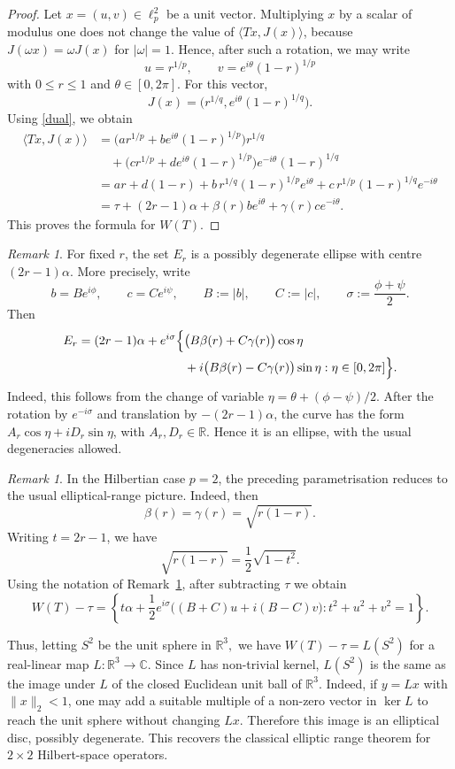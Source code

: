 \documentclass[11pt]{amsart}
\numberwithin{equation}{section}
\theoremstyle{definition}
\theoremstyle{remark}
\newtheorem{remark}[theorem]{Remark}
\newcommand{\R}{\mathbb{R}}
\newcommand{\ip}[2]{\langle #1,#2\rangle}
\begin{document}
\begin{proof}
Let $x=(u,v)\in\ell_p^2$ be a unit vector. Multiplying $x$ by a scalar of modulus one does not change the value of
$\ip{Tx}{J(x)}$, because $J(\omega x)=\omega J(x)$ for $|\omega|=1$. Hence, after such a rotation, we may write
\[
u=r^{1/p},\qquad v=e^{i\theta}(1-r)^{1/p}
\]
with $0\le r\le1$ and $\theta\in [0,2\pi].$ For this vector,
\[
J(x)=\bigl(r^{1/q},e^{i\theta}(1-r)^{1/q}\bigr).
\]
Using \eqref{dual}, 
we obtain
\begin{align*}
\ip{Tx}{J(x)}
&=\bigl(ar^{1/p}+be^{i\theta}(1-r)^{1/p}\bigr)r^{1/q}  \\
&\quad+\bigl(cr^{1/p}+de^{i\theta}(1-r)^{1/p}\bigr)e^{-i\theta}(1-r)^{1/q} \\
&=ar+d(1-r)+b\,r^{1/q}(1-r)^{1/p}e^{i\theta}
   +c\,r^{1/p}(1-r)^{1/q}e^{-i\theta} \\
&=\tau+(2r-1)\alpha+\beta(r)be^{i\theta}+
   \gamma(r)ce^{-i\theta}.
\end{align*}
This proves the formula for $W(T)$.
\end{proof}

\begin{remark}\label{rem:lp2-ellipses}
For fixed $r$, the set $E_r$ is a possibly degenerate ellipse with centre
$(2r-1)\alpha$. More precisely, write
\[
b=Be^{i\phi},\qquad c=Ce^{i\psi},\qquad
B:=|b|,
\qquad C:=|c|,
\qquad \sigma:=\frac{\phi+\psi}{2}.
\]
Then
\[
\begin{aligned}
E_r=(2r-1)\alpha+e^{i\sigma}
\Bigl\{&\bigl(B\beta(r)+C\gamma(r)\bigr)\cos\eta\\
&+i\bigl(B\beta(r)-C\gamma(r)\bigr)\sin\eta:
\eta\in [0,2\pi]
\Bigr\}.
\end{aligned}
\]
Indeed, this follows from the change of variable
$\eta=\theta+(\phi-\psi)/2$. After the rotation by $e^{-i\sigma}$ and
translation by $-(2r-1)\alpha$, the curve has the form
$A_r\cos\eta+iD_r\sin\eta$, with $A_r,D_r\in\R$. Hence it is an ellipse,
with the usual degeneracies allowed.
\end{remark}

\begin{remark}\label{rem:p2-elliptic-range}
In the Hilbertian case $p=2$, the preceding parametrisation reduces to the usual elliptical-range picture. Indeed, then
\[
\beta(r)=\gamma(r)=\sqrt{r(1-r)}.
\]
Writing $t=2r-1$, we have
\[
\sqrt{r(1-r)}=\frac12\sqrt{1-t^2}.
\]
Using the notation of Remark~\ref{rem:lp2-ellipses}, after subtracting $\tau$ we obtain
\[
W(T)-\tau=
\left\{
 t\alpha+\frac12 e^{i\sigma}
 \bigl((B+C)u+i(B-C)v\bigr):
 t^2+u^2+v^2=1
\right\}.
\]

Thus, letting $S^2$ be the unit sphere in $\mathbb R^3,$ we have \(W(T)-\tau=L(S^2)\) for a real-linear map \(L:\mathbb R^3\to\mathbb C\).
Since \(L\) has non-trivial kernel, \(L(S^2)\) is the same as the image under
\(L\) of the closed Euclidean unit ball of \(\mathbb R^3\). Indeed, if
\(y=Lx\) with \(\|x\|_2<1\), one may add a suitable multiple of a non-zero
vector in \(\ker L\) to reach the unit sphere without changing \(Lx\).
Therefore this image is an elliptical disc, possibly degenerate.
This recovers the classical elliptic range theorem for $2\times2$ Hilbert-space operators.
\end{remark}
\end{document}
